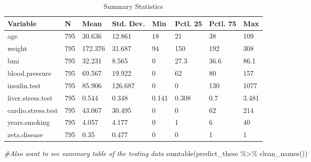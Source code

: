 \documentclass[
]{article}
\newenvironment{Shaded}{\begin{snugshade}}{\end{snugshade}}
\newcommand{\CommentTok}[1]{\textcolor[rgb]{0.56,0.35,0.01}{\textit{#1}}}
\newcommand{\FunctionTok}[1]{\textcolor[rgb]{0.00,0.00,0.00}{#1}}
\newcommand{\NormalTok}[1]{#1}
\newcommand{\SpecialCharTok}[1]{\textcolor[rgb]{0.00,0.00,0.00}{#1}}
\begin{document}
\begin{table}

\caption{\label{tab:dataLoad}Summary Statistics}
\centering
\begin{tabular}[t]{llllllll}
\toprule
Variable & N & Mean & Std. Dev. & Min & Pctl. 25 & Pctl. 75 & Max\\
\midrule
age & 795 & 30.636 & 12.861 & 18 & 21 & 38 & 109\\
weight & 795 & 172.376 & 31.687 & 94 & 150 & 192 & 308\\
bmi & 795 & 32.231 & 8.565 & 0 & 27.3 & 36.6 & 86.1\\
blood.pressure & 795 & 69.567 & 19.922 & 0 & 62 & 80 & 157\\
insulin.test & 795 & 85.906 & 126.687 & 0 & 0 & 130 & 1077\\
\addlinespace
liver.stress.test & 795 & 0.544 & 0.348 & 0.141 & 0.308 & 0.7 & 3.481\\
cardio.stress.test & 795 & 43.067 & 30.495 & 0 & 0 & 62 & 214\\
years.smoking & 795 & 4.057 & 4.177 & 0 & 1 & 6 & 40\\
zeta.disease & 795 & 0.35 & 0.477 & 0 & 0 & 1 & 1\\
\bottomrule
\end{tabular}
\end{table}

\begin{Shaded}
\begin{Highlighting}[]
\CommentTok{\#Also want to see summary table of the testing data}
\FunctionTok{sumtable}\NormalTok{(predict\_these }\SpecialCharTok{\%\textgreater{}\%} \FunctionTok{clean\_names}\NormalTok{())}
\end{Highlighting}
\end{Shaded}
\end{document}
